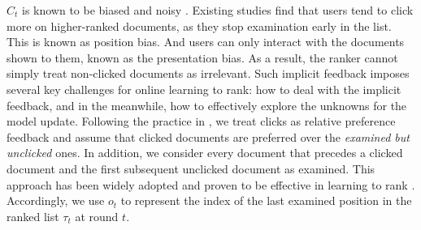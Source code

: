 $C_t$ is known to be biased and noisy \cite{joachims2005accurately,agichtein2006improving,joachims2007evaluating}. Existing studies find that users tend to click more on higher-ranked documents, as they stop examination early in the list. This is known as position bias. And users can only interact with the documents shown to them, known as the presentation bias. As a result, the ranker cannot simply treat non-clicked documents as irrelevant. 
Such implicit feedback imposes several key challenges for online learning to rank: how to deal with the implicit feedback, and in the meanwhile, how to effectively explore the unknowns for the model update. 
Following the practice in \cite{joachims2005accurately}, we treat clicks as relative preference feedback and assume that clicked documents are preferred over the \emph{examined but unclicked} ones. In addition, we consider every document that precedes a clicked document and the first subsequent unclicked document as examined. This approach has been widely adopted and proven to be effective in learning to rank \cite{wang2019variance,agichtein2006improving,oosterhuis2018differentiable}. Accordingly, we use $o_t$ to represent the index of the last examined position in the ranked list $\tau_t$ at round $t$.

